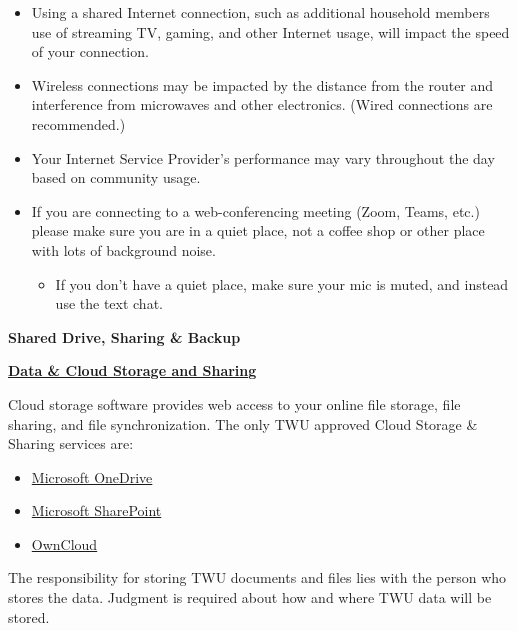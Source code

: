 \documentclass[
]{book}
\providecommand{\tightlist}{%
  \setlength{\itemsep}{0pt}\setlength{\parskip}{0pt}}
\theoremstyle{definition}
\theoremstyle{definition}
\theoremstyle{definition}
\theoremstyle{definition}
\theoremstyle{remark}
\begin{document}
\begin{itemize}
\tightlist
\item
  Using a shared Internet connection, such as additional household members use of streaming TV, gaming, and other Internet usage, will impact the speed of your connection.\\
\item
  Wireless connections may be impacted by the distance from the router and interference from microwaves and other electronics. (Wired connections are recommended.)\\
\item
  Your Internet Service Provider's performance may vary throughout the day based on community usage.
\item
  If you are connecting to a web-conferencing meeting (Zoom, Teams, etc.) please make sure you are in a quiet place, not a coffee shop or other place with lots of background noise.

  \begin{itemize}
  \tightlist
  \item
    If you don't have a quiet place, make sure your mic is muted, and instead use the text chat.
  \end{itemize}
\end{itemize}

\textbf{Shared Drive, Sharing \& Backup}

\href{https://trinitywestern.teamdynamix.com/TDClient/1904/Portal/KB/ArticleDet?ID=128533}{\textbf{Data \& Cloud Storage and Sharing}}

Cloud storage software provides web access to your online file storage, file sharing, and file synchronization. The only TWU approved Cloud Storage \& Sharing services are:

\begin{itemize}
\tightlist
\item
  \href{https://trinitywestern.teamdynamix.com/TDClient/1904/Portal/KB/ArticleDet?ID=71260}{Microsoft OneDrive}\\
\item
  \href{https://mytwu.sharepoint.com/}{Microsoft SharePoint}\\
\item
  \href{https://trinitywestern.teamdynamix.com/TDClient/1904/Portal/KB/ArticleDet?ID=15681}{OwnCloud}
\end{itemize}

The responsibility for storing TWU documents and files lies with the person who stores the data. Judgment is required about how and where TWU data will be stored.
\end{document}
